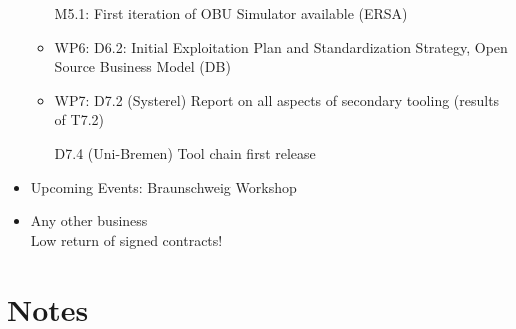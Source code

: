 \documentclass[a4paper, 11pt]{article}
\begin{document}
\begin{itemize}
\begin{itemize}
           M5.1: First iteration of OBU Simulator available (ERSA)
\item WP6: D6.2: Initial Exploitation Plan and Standardization Strategy, Open Source Business Model (DB)
\item WP7: D7.2 (Systerel) Report on all aspects of secondary tooling (results of T7.2)

           D7.4 (Uni-Bremen) Tool chain first release

\end{itemize}
\item Upcoming Events: Braunschweig Workshop
\item Any other business\\
Low return of signed contracts!

\end{itemize}

\section{Notes}
\end{document}
